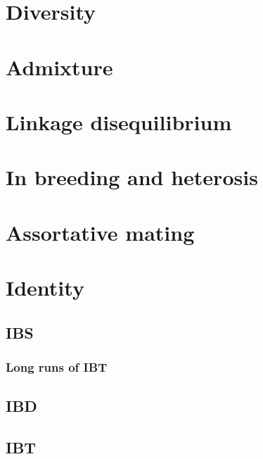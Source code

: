 \documentclass[
]{book}
\begin{document}
\hypertarget{diversity}{%
\chapter{Diversity}\label{diversity}}

\hypertarget{admixture}{%
\chapter{Admixture}\label{admixture}}

\hypertarget{linkage-disequilibrium}{%
\chapter{Linkage disequilibrium}\label{linkage-disequilibrium}}

\hypertarget{in-breeding-and-heterosis}{%
\chapter{In breeding and heterosis}\label{in-breeding-and-heterosis}}

\hypertarget{assortative-mating}{%
\chapter{Assortative mating}\label{assortative-mating}}

\hypertarget{identity}{%
\chapter{Identity}\label{identity}}

\hypertarget{ibs}{%
\section{IBS}\label{ibs}}

\hypertarget{long-runs-of-ibt}{%
\subsection{Long runs of IBT}\label{long-runs-of-ibt}}

\hypertarget{ibd}{%
\section{IBD}\label{ibd}}

\hypertarget{ibt}{%
\section{IBT}\label{ibt}}
\end{document}
